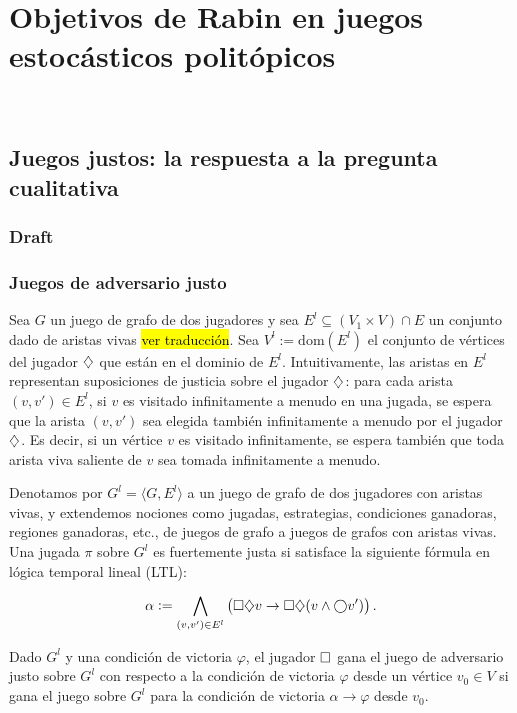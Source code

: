 \chapter{Objetivos de Rabin en juegos estocásticos politópicos}
~\label{cap:results}



\section{Juegos justos: la respuesta a la pregunta cualitativa}

\subsection{Draft}

\subsection{Juegos de adversario justo}

Sea $G$ un juego de grafo de dos jugadores y sea $E^{l} \subseteq (V_1 \times
	V) \cap E$ un conjunto dado de aristas vivas \hl{ver traducción}. Sea $V^{l} :=
	\mathrm{dom}(E^{l})$ el conjunto de vértices del jugador $\diamondsuit$ que están en
el dominio de $E^{l}$. Intuitivamente, las aristas en $E^{l}$ representan
suposiciones de justicia sobre el jugador $\diamondsuit$: para cada arista $(v, v')
	\in E^{l}$, si $v$ es visitado infinitamente a menudo en una jugada, se espera
que la arista $(v, v')$ sea elegida también infinitamente a menudo por el
jugador $\diamondsuit$. Es decir, si un vértice $v$ es visitado infinitamente, se
espera también que toda arista viva saliente de $v$ sea tomada infinitamente a
menudo.

Denotamos por $G^{l} = \langle G, E^{l} \rangle$ a un juego de grafo de dos
jugadores con aristas vivas, y extendemos nociones como jugadas, estrategias,
condiciones ganadoras, regiones ganadoras, etc., de juegos de grafo a juegos de
grafos con aristas vivas. Una jugada $\pi$ sobre $G^{l}$ es fuertemente justa
si satisface la siguiente fórmula en lógica temporal lineal (LTL):

\[
	\alpha := \bigwedge_{(v, v') \in E^{l}} \left( \square \diamondsuit v \rightarrow \square \diamondsuit (v \wedge \bigcirc v') \right).
\]

Dado $G^{l}$ y una condición de victoria $\varphi$, el jugador $\square$ gana el
juego de adversario justo sobre $G^{l}$ con respecto a la condición de victoria
$\varphi$ desde un vértice $v_0 \in V$ si gana el juego sobre $G^{l}$ para la
condición de victoria $\alpha \rightarrow \varphi$ desde $v_0$.

